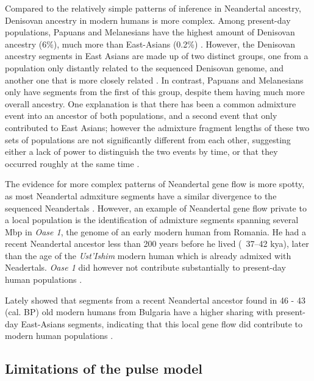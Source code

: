 \documentclass[]{article}
\begin{document}
Compared to the relatively simple patterns of inference in Neandertal ancestry, Denisovan ancestry in modern humans is more complex. Among present-day populations, Papuans and Melanesians have the highest amount of Denisovan ancestry (6\%), much more than East-Asians (0.2\%) \citep{reich_genetic_2010,meyer_high-coverage_2012}.
However, the Denisovan ancestry segments in East Asians are made up of two distinct groups, one from a population only distantly related to the sequenced Denisovan genome, and another one that is more closely related \citep{browning_analysis_2018}. In contrast, Papuans and Melanesians only have segments from the first of this group, despite them having much more overall ancestry.
One explanation is that there has been a common admixture event into an ancestor of both populations, and a second event that only contributed to East Asians; however the admixture fragment lengths of these two sets of populations are not significantly different from each other, suggesting either a lack of power to distinguish the two events by time, or that they occurred roughly at the same time \citep{browning_analysis_2018}.



The evidence for more complex patterns of Neandertal gene flow is more spotty, as most Neandertal admxiture segments have a similar divergence to the sequenced Neandertals \citep{browning_analysis_2018}. However, an example of  Neandertal gene flow private to a local population is the identification of admixture segments spanning several Mbp in \textit{Oase 1}, the genome of an early modern human from Romania. He had a recent Neandertal ancestor less than 200 years before he lived (~37–42 kya), later than the age of the \textit{Ust'Ishim} modern human which is already admixed with Neadertals. \textit{Oase 1} did however not contribute substantially to present-day human populations  \citep{fu_genome_2014,fu_early_2015}.

Lately \cite{hajdinjak_early_2021} showed that segments from a recent Neandertal ancestor found in  46 - 43 (cal. BP) old modern humans from Bulgaria have a higher sharing with present-day East-Asians segments, indicating that this local gene flow did contribute to modern human populations \citep{hajdinjak_early_2021}.    

\subsection{Limitations of the pulse model}\label{Why can't we us the pulse model}
\end{document}
